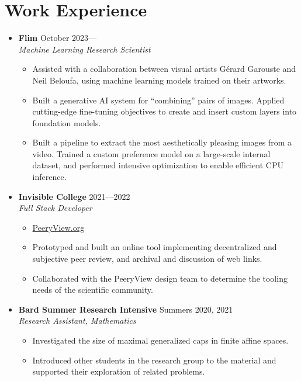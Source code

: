 \documentclass[12pt,letterpaper]{article}
\newenvironment{explist}
{\begin{itemize}[label=\textbf{--},itemsep=1pt,topsep=0pt,partopsep=0pt,parsep=0pt]}
{\end{itemize}}
\begin{document}
\section*{Work Experience} \vspace{-0.5em}
\begin{itemize}[label=,itemsep=0pt]
    \item
    \textbf{Flim} \hfill October 2023---\\
    \textit{Machine Learning Research Scientist}
    \begin{explist}
        \item Assisted with a collaboration between visual artists G\'erard Garouste and Neil Beloufa, using machine learning models trained on their artworks.
        \item Built a generative AI system for ``combining'' pairs of images.
            Applied cutting-edge fine-tuning objectives to create and insert custom layers into foundation models.
        \item Built a pipeline to extract the most aesthetically pleasing images from a video.
            Trained a custom preference model on a large-scale internal dataset,
            and performed intensive optimization to enable efficient CPU inference.
    \end{explist}
    \item
    \textbf{Invisible College} \hfill 2021---2022\\
    \textit{Full Stack Developer}
    \begin{explist}
    \item \href{https://peeryview.org}{PeeryView.org}
        \item Prototyped and built an online tool implementing decentralized and subjective peer review, and archival and discussion of web links.
        \item Collaborated with the PeeryView design team to determine the tooling needs of the scientific community.
    \end{explist}
    \item
    \textbf{Bard Summer Research Intensive} \hfill Summers 2020, 2021\\
    \textit{Research Assistant, Mathematics}
    \begin{explist}
        \item Investigated the size of maximal generalized caps in finite affine spaces.
        \item Introduced other students in the research group to the material and supported their exploration of related problems.
    \end{explist}


\end{itemize}
\end{document}

